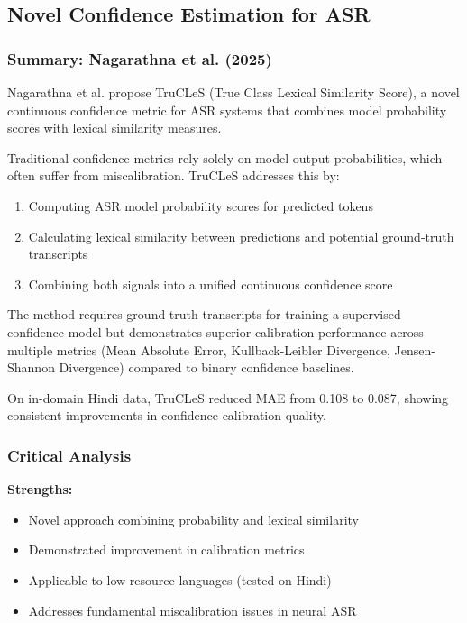 \subsection{Novel Confidence Estimation for ASR}

\subsubsection{Summary: Nagarathna et al. (2025)}

Nagarathna et al. \cite{nagarathna2025} propose TruCLeS (True Class Lexical Similarity Score), a novel continuous confidence metric for ASR systems that combines model probability scores with lexical similarity measures.

Traditional confidence metrics rely solely on model output probabilities, which often suffer from miscalibration. TruCLeS addresses this by:

\begin{enumerate}[topsep=6pt,itemsep=3pt]
    \item Computing ASR model probability scores for predicted tokens
    \item Calculating lexical similarity between predictions and potential ground-truth transcripts
    \item Combining both signals into a unified continuous confidence score
\end{enumerate}

The method requires ground-truth transcripts for training a supervised confidence model but demonstrates superior calibration performance across multiple metrics (Mean Absolute Error, Kullback-Leibler Divergence, Jensen-Shannon Divergence) compared to binary confidence baselines.

On in-domain Hindi data, TruCLeS reduced MAE from 0.108 to 0.087, showing consistent improvements in confidence calibration quality.

\subsubsection{Critical Analysis}

\textbf{Strengths:}
\begin{itemize}[topsep=4pt,itemsep=2pt]
    \item Novel approach combining probability and lexical similarity
    \item Demonstrated improvement in calibration metrics
    \item Applicable to low-resource languages (tested on Hindi)
    \item Addresses fundamental miscalibration issues in neural ASR
\end{itemize}

